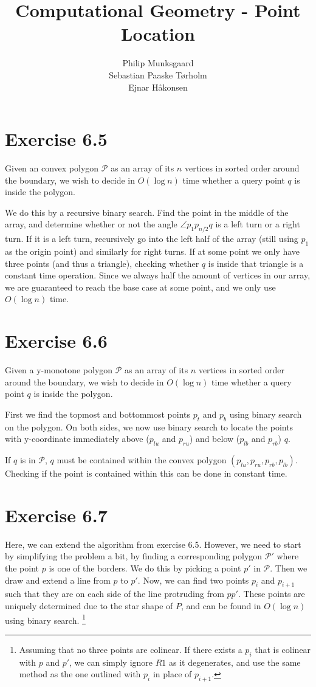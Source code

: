 \documentclass[11pt,a4paper]{article}
\title{Computational Geometry - Point Location}
\author{Philip Munksgaard \\ Sebastian Paaske Tørholm \\ Ejnar Håkonsen}
\begin{document}
\maketitle

\section{Exercise 6.5}

Given an convex polygon $\mathcal{P}$ as an array of its $n$ vertices
in sorted order around the boundary, we wish to decide in $O(\log n)$
time whether a query point $q$ is inside the polygon.

We do this by a recursive binary search. Find the point in the middle
of the array, and determine whether or not the angle $\angle p_1
p_{n/2} q$ is a left turn or a right turn. If it is a left turn,
recursively go into the left half of the array (still using $p_1$ as
the origin point) and similarly for right turns. If at some point we
only have three points (and thus a triangle), checking whether $q$ is
inside that triangle is a constant time operation. Since we always
half the amount of vertices in our array, we are guaranteed to reach
the base case at some point, and we only use $O(\log n)$ time.

\section{Exercise 6.6}
Given a y-monotone polygon $\mathcal{P}$ as an array of its $n$ vertices
in sorted order around the boundary, we wish to decide in $O(\log n)$
time whether a query point $q$ is inside the polygon.

First we find the topmost and bottommost points $p_t$ and $p_b$ using binary
search on the polygon. On both sides, we now use binary search to locate the
points with y-coordinate immediately above ($p_{lu}$ and $p_{ru}$) and below
($p_{lb}$ and $p_{rb}$) $q$.

If $q$ is in $\mathcal{P}$, $q$ must be contained within the convex polygon
$(p_{lu}, p_{ru}, p_{rb}, p_{lb})$. Checking if the point is contained
within this can be done in constant time.

\section{Exercise 6.7}

Here, we can extend the algorithm from exercise 6.5. However, we
need to start by simplifying the problem a bit, by finding a
corresponding polygon $\mathcal{P}'$ where the point $p$ is one of the
borders. We do this by picking a point $p'$ in $\mathcal{P}$. Then we
draw and extend a line from $p$ to $p'$. Now, we can find two points
$p_i$ and $p_{i+1}$ such that they are on each side of the line
protruding from $pp'$. These points are uniquely determined due to the
star shape of $P$, and can be found in $O(\log n)$ using binary search.
\footnote{Assuming that no three points are colinear. If there exists
    a $p_i$ that is colinear with $p$ and $p'$, we can simply ignore
    $R1$ as it degenerates, and use the same method as the one outlined
    with $p_i$ in place of $p_{i+1}$.}
\end{document}
